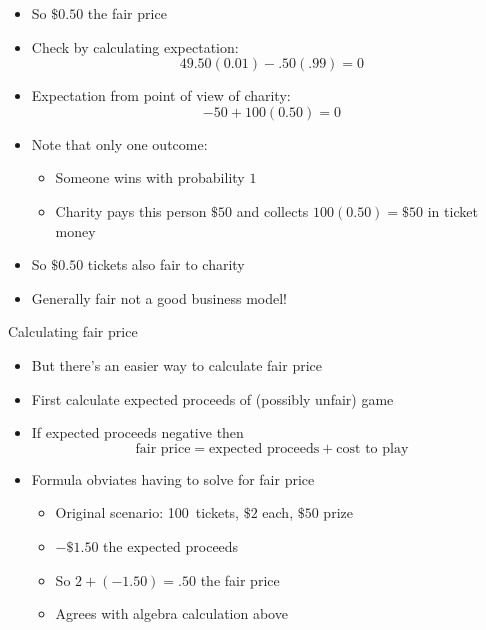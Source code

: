 \documentclass{beamer}
\theoremstyle{definition}
\begin{document}
\begin{frame}
\begin{itemize}
\item So $\$0.50$ the fair price
\item Check by calculating expectation:
\[49.50\left(0.01\right)-.50\left(.99\right)=0\]
\item Expectation from point of view of charity:
\[-50+100\left(0.50\right)=0\]
\item Note that only one outcome:
\begin{itemize}
\item Someone wins with probability $1$
\item Charity pays this person $\$50$ and collects $100\left(0.50\right)
=\$50$ in ticket money
\end{itemize}
\item So $\$0.50$ tickets also \alert{fair} to charity
\item Generally \alert{fair} not a good business model!
\end{itemize}
\end{frame}

\begin{frame}{Calculating fair price}
\begin{itemize}
\item But there's an easier way to calculate fair price
\item First calculate expected proceeds of (possibly unfair) game
\item If expected proceeds \alert{negative} then
\[\text{fair price}=\text{expected proceeds}+\text{cost to play}\]
\item Formula obviates having to solve for fair price
\begin{example}
\begin{itemize}
\item Original scenario: 100~tickets, $\$2$ each, $\$50$ prize
\item $-\$1.50$ the expected proceeds
\item So $2+\left(-1.50\right)=.50$ the fair price
\item Agrees with algebra calculation above
\end{itemize}
\end{example}
\end{itemize}
\end{frame}
\end{document}
